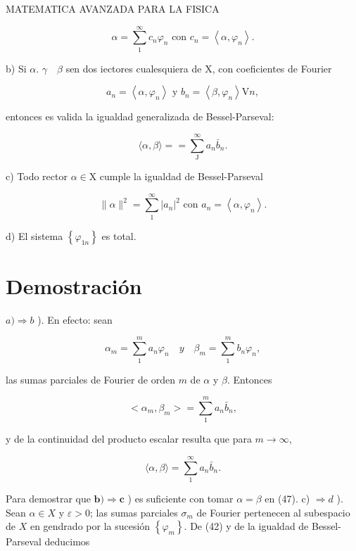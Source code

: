 \documentclass[10pt]{article}
\theoremstyle{plain}
\theoremstyle{definition}
\theoremstyle{remark}
\begin{document}
MATEMATICA AVANZADA PARA LA FISICA


\begin{equation*}
\alpha=\sum_{1}^{\infty} c_{n} \varphi_{n} \text { con } c_{n}=\left\langle\alpha, \varphi_{n}\right\rangle . \tag{4-6}
\end{equation*}


b) Si $\alpha$. $\gamma \quad \beta$ sen dos iectores cualesquiera de X, con coeficientes de Fourier


\begin{equation*}
a_{n}=\left\langle\alpha, \varphi_{n}\right\rangle \text { y } b_{n}=\left\langle\beta, \varphi_{n}\right\rangle \mathrm{V} n, \tag{4-7}
\end{equation*}


entonces es valida la igualdad generalizada de Bessel-Parseval:

$$
\langle\alpha, \beta\rangle==\sum_{\mathrm{J}}^{\infty} a_{n} \bar{b}_{n} .
$$

c) Todo rector $\alpha \in \mathrm{X}$ cumple la igualdad de Bessel-Parseval


\begin{equation*}
\|\alpha\|^{2}=\sum_{1}^{\infty}\left|a_{n}\right|^{2} \text { con } a_{n}=\left\langle\alpha, \varphi_{n}\right\rangle . \tag{4-8}
\end{equation*}


d) El sistema $\left\{\varphi_{1 n}\right\}$ es total.

\section*{Demostración}
$a) \Rightarrow b$ ). En efecto: sean

$$
\alpha_{m}=\sum_{1}^{m} a_{n} \varphi_{n} \quad y \quad \beta_{m}=\sum_{1}^{m} b_{n} \varphi_{n},
$$

las sumas parciales de Fourier de orden $m$ de $\alpha$ y $\beta$. Entonces


\begin{equation*}
<\alpha_{m}, \beta_{m}>=\sum_{1}^{m} a_{n} \bar{b}_{n}, \tag{4-9}
\end{equation*}


y de la continuidad del producto escalar resulta que para $m \rightarrow \infty$,

$$
\langle\alpha, \beta\rangle=\sum_{1}^{\infty} a_{n} \bar{b}_{n} .
$$

Para demostrar que $\boldsymbol{b}) \Rightarrow \boldsymbol{c}$ ) es suficiente con tomar $\alpha=\beta$ en (47). c) $\Rightarrow d$ ). Sean $\alpha \in X$ y $\varepsilon>0$; las sumas parciales $\sigma_{m}$ de Fourier pertenecen al subespacio de $X$ en gendrado por la sucesión $\left\{\varphi_{m}\right\}$. De (42) y de la igualdad de Bessel-Parseval deducimos
\end{document}

